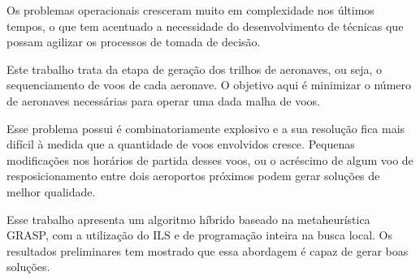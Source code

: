 \documentclass[oneside,normaltoc,espacoumemeio,PGTEXdissertacao]{pgeeltex}
\begin{document}
\begin{resumoPGTEX}
Os problemas operacionais cresceram muito em complexidade nos
últimos tempos, o que tem acentuado a necessidade do desenvolvimento de
técnicas que possam agilizar os processos de tomada de decisão. 


Este trabalho trata da etapa de geração dos trilhos de aeronaves, ou seja, o
sequenciamento de voos de cada aeronave. O objetivo aqui é minimizar o número de
aeronaves necessárias para operar uma dada malha de voos.
 
 
 Esse problema possui é combinatoriamente explosivo e a sua resolução fica mais
 difícil à medida que a quantidade de voos envolvidos cresce. Pequenas
 modificações nos horários de partida desses voos, ou o acréscimo de algum voo
 de resposicionamento entre dois aeroportos próximos podem gerar soluções de
 melhor qualidade.
 
 Esse trabalho apresenta um algoritmo híbrido baseado na metaheurística GRASP,
 com a utilização do ILS e de programação inteira na busca local. 
 Os resultados preliminares tem mostrado que essa abordagem é capaz de
 gerar boas soluções.
 
 \\
 
 \end{resumoPGTEX}
\end{document}
